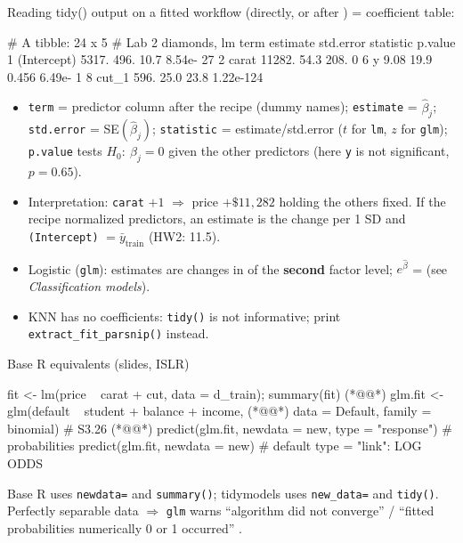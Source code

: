 \begin{topic}{Reading tidy() output}
 on a fitted workflow (directly, or after ) = coefficient table:
\begin{routput}
# A tibble: 24 x 5                     # Lab 2 diamonds, lm
   term        estimate std.error statistic   p.value
 1 (Intercept)  5317.      496.      10.7   8.54e- 27
 2 carat       11282.       54.3    208.    0
 6 y               9.08     19.9      0.456 6.49e-  1
 8 cut_1         596.       25.0     23.8   1.22e-124
\end{routput}
\begin{itemize}
\item \texttt{term} = predictor column after the recipe (dummy names); \texttt{estimate} = $\hat\beta_j$;
  \texttt{std.error} = SE$(\hat\beta_j)$; \texttt{statistic} = estimate/std.error ($t$ for \texttt{lm}, $z$ for
  \texttt{glm}); \texttt{p.value} tests $H_0{:}\ \beta_j=0$ given the other predictors (here \texttt{y} is not significant, $p=0.65$).
\item Interpretation: \texttt{carat} $+1$ $\Rightarrow$ price $+\$11{,}282$ holding the others fixed. If the recipe
  normalized predictors, an estimate is the change per 1 SD and \texttt{(Intercept)} $=\bar y_{\text{train}}$ (HW2: 11.5).
\item Logistic (\texttt{glm}): estimates are changes in  of the \textbf{second} factor level; $e^{\hat\beta}$ = 
  (see \emph{Classification models}).
\item KNN has no coefficients: \texttt{tidy()} is not informative; print \texttt{extract\_fit\_parsnip()} instead.
\end{itemize}
\end{topic}

\begin{topic}{Base R equivalents (slides, ISLR)}
\begin{rcode}
fit <- lm(price ~ carat + cut, data = d_train); summary(fit) (*@@*)
glm.fit <- glm(default ~ student + balance + income,        (*@@*)
               data = Default, family = binomial)   # S3.26 (*@@*)
predict(glm.fit, newdata = new, type = "response")  # probabilities
predict(glm.fit, newdata = new)  # default type = "link": LOG ODDS
\end{rcode}
Base R uses \texttt{newdata=} and \texttt{summary()}; tidymodels uses \texttt{new\_data=} and \texttt{tidy()}.
Perfectly separable data $\Rightarrow$ \texttt{glm} warns ``algorithm did not converge'' / ``fitted probabilities
numerically 0 or 1 occurred'' .
\end{topic}

